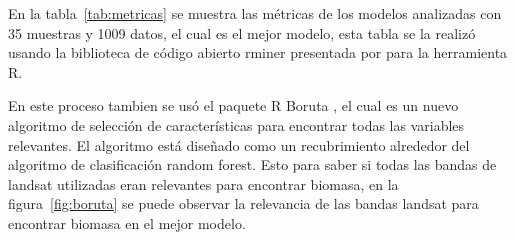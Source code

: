 En la tabla~\ref{tab:metricas} se muestra las métricas de los modelos analizadas con 35 muestras y 1009 datos, el cual es el mejor modelo, esta tabla 
se la realizó usando la biblioteca de código abierto rminer presentada por \cite{cortez2010data} para la herramienta R.

\begin{table}
\caption{Métricas de modelos analizados con 35 muestras y 1009 datos}
\label{tab:metricas}
\centering
{}
\end{table}

En este proceso tambien se usó el paquete R Boruta \cite{kursa2010feature}, el cual es un nuevo algoritmo de selección de características 
para encontrar todas las variables relevantes. El algoritmo está diseñado como un recubrimiento alrededor 
del algoritmo de clasificación random forest. Esto para saber si todas las bandas de landsat utilizadas eran relevantes para encontrar biomasa, 
en la figura~\ref{fig:boruta} se puede observar la relevancia de las bandas landsat para encontrar biomasa en el mejor modelo.

